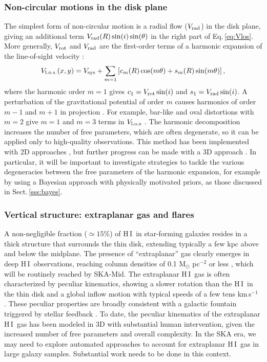 \documentclass[a4paper,11pt]{article}
\newcommand{\hi } {{\rm H}\,{\small\rm I}}
\begin{document}
\subsubsection{Non-circular motions in the disk plane}\label{sec:noncircular}

The simplest form of non-circular motion is a radial flow ($V_{\rm rad}$) in the disk plane, giving an additional term $V_{\rm rad}(R)\sin(i)\sin(\theta)$ in the right part of Eq.\,\ref{eq:Vlos}. More generally, $V_{\rm rot}$ and $V_{\rm rad}$ are the first-order terms of a harmonic expansion of the line-of-sight velocity \citep{Schoen1997}:
\begin{equation}
  V_{\rm l.o.s.}(x, y) = V_{\rm sys} + \sum_{m=1} \left [ c_{m}(R)\cos(m\theta) + s_{m}(R)\sin (m\theta) \right ],
\end{equation}
where the harmonic order $m=1$ gives $c_{1} = V_{\rm rot}\sin(i)$ and $s_{1} = V_{\rm rad}\sin(i)$. A perturbation of the gravitational potential of order $m$ causes harmonics of order $m-1$ and $m+1$ in projection \citep{Schoen1997}. For example, bar-like and oval distortions with $m=2$ give $m=1$ and $m=3$ terms in $V_{\rm l.o.s}$ \citep{Spekkens2007}. The harmonic decomposition increases the number of free parameters, which are often degenerate, so it can be applied only to high-quality observations. This method has been implemented with 2D approaches \citep{Gentile2005, Gentile2007, Trachternach2008, Marasco2018}, but further progress can be made with a 3D approach \citep{Hogarth24}. In particular, it will be important to investigate strategies to tackle the various degeneracies between the free parameters of the harmonic expansion, for example by using a Bayesian approach with physically motivated priors, as those discussed in Sect.\,\ref{sss:bayes}.

\subsubsection{Vertical structure: extraplanar gas and flares}\label{sec:vertical}

A non-negligible fraction ($\simeq15\%$) of \hi\ in star-forming galaxies resides in a thick structure that surrounds the thin disk, extending typically a few kpc above and below the midplane. The presence of ``extraplanar'' gas clearly emerges in deep \hi\ observations, reaching column densities of 0.1 M$_\odot$ pc$^{-2}$ or less \citep{Fraternali02, Oosterloo07}, which will be routinely reached by SKA-Mid. The extraplanar \hi\ gas is often characterized by peculiar kinematics, showing a slower rotation than the \hi\ in the thin disk and a global inflow motion with typical speeds of a few tens km\,s$^{-1}$ \citep[e.g.,][]{Fraternali02, Oosterloo07, Marasco2019}. These peculiar properties are broadly consistent with a galactic fountain triggered by stellar feedback \citep{Fraternali17}. To date, the peculiar kinematics of the extraplanar \hi\ gas has been modeled in 3D with substantial human intervention, given the increased number of free parameters and overall complexity. In the SKA era, we may need to explore automated approaches to account for extraplanar \hi\ gas in large galaxy samples. Substantial work needs to be done in this context.
\end{document}
